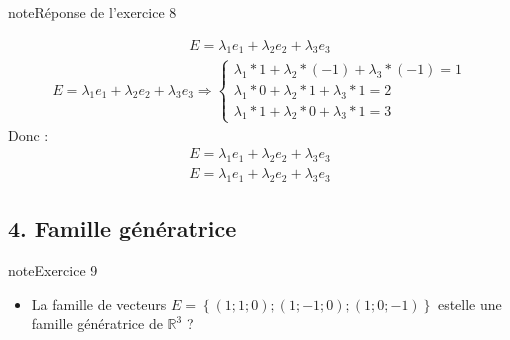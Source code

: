 \documentclass[letterpaper,10pt,french]{jupyterBook}
\begin{document}
\begin{sphinxadmonition}{note}{Réponse de l’exercice 8}
\begin{itemize}
\end{itemize}
\begin{equation*}
\begin{split}
E = \lambda_1 e_1 + \lambda_2 e_2 + \lambda_3 e_3
\end{split}
\end{equation*}\begin{equation*}
\begin{split}
E = \lambda_1 e_1 + \lambda_2 e_2 + \lambda_3 e_3 \Rightarrow 
    \begin{cases}
      \lambda_1*1 + \lambda_2* (-1) +\lambda_3*(-1)= 1 \\
      \lambda_1*0 + \lambda_2*1 + \lambda_3*1= 2 \\
      \lambda_1*1 + \lambda_2*0 + \lambda_3*1= 3 
      \end{cases}
\end{split}
\end{equation*}
\sphinxAtStartPar
Donc :
\begin{equation*}
\begin{split}
E = \lambda_1 e_1 + \lambda_2 e_2 + \lambda_3 e_3
\end{split}
\end{equation*}\begin{equation*}
\begin{split}
E = \lambda_1 e_1 + \lambda_2 e_2 + \lambda_3 e_3
\end{split}
\end{equation*}\end{sphinxadmonition}


\subsection{4. Famille génératrice}
\label{\detokenize{S_xe9rie1:famille-generatrice}}
\begin{sphinxadmonition}{note}{Exercice 9}
\begin{itemize}
\item {} 
\sphinxAtStartPar
La famille de vecteurs \(E = \left\{(1; 1; 0); (1;-1; 0); (1; 0; -1)\right\}\) est\sphinxhyphen{}elle une famille génératrice de \(\mathbb{R}^3\) ? 

\end{itemize}
\end{sphinxadmonition}
\end{document}
